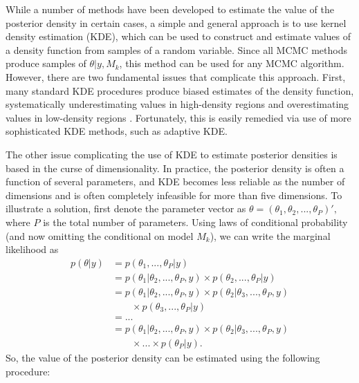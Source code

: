 \documentclass[twocolumn]{article}
\begin{document}
While a number of methods have been developed to estimate the value of the posterior density in certain cases, a simple and general approach is to use kernel density estimation (KDE), which can be used to construct and estimate values of a density function from samples of a random variable. Since all MCMC methods produce samples of $\theta|y, M_k$, this method can be used for any MCMC algorithm. However, there are two fundamental issues that complicate this approach. First, many standard KDE procedures produce biased estimates of the density function, systematically underestimating values in high-density regions and overestimating values in low-density regions \citep{SilvermanDE}. Fortunately, this is easily remedied via use of more sophisticated KDE methods, such as adaptive KDE.

The other issue complicating the use of KDE to estimate posterior densities is based in the curse of dimensionality. In practice, the posterior density is often a function of several parameters, and KDE becomes less reliable as the number of dimensions and is often completely infeasible for more than five dimensions. To illustrate a solution, first denote the parameter vector as $\theta = (\theta_1, \theta_2, ..., \theta_P)',$ where $P$ is the total number of parameters. Using laws of conditional probability (and now omitting the conditional on model $M_k$), we can write the marginal likelihood as
\begin{subequations}
\begin{align}
	p(\theta|y)
	&= p(\theta_1, ..., \theta_P|y) \\
	&= p(\theta_1|\theta_2, ..., \theta_P, y)\times p(\theta_2, ..., \theta_P|y) \\
	&= p(\theta_1|\theta_2, ..., \theta_P, y)\times p(\theta_2|\theta_3, ..., \theta_P, y) \\ &\qquad\times p(\theta_3, ..., \theta_P|y) \\
	&= ... \\
	&= p(\theta_1|\theta_2, ..., \theta_P, y)\times p(\theta_2|\theta_3, ..., \theta_P, y)\\ &\qquad\times ...\times p(\theta_P|y).
\end{align}
\end{subequations}
So, the value of the posterior density can be estimated using the following procedure:
\end{document}
